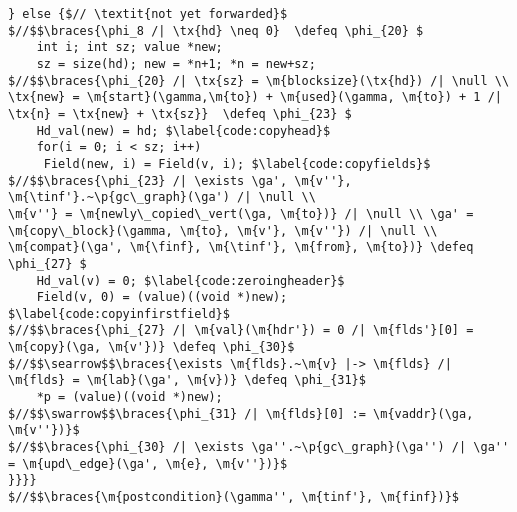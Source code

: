 \begin{figure*}[!ht]
\begin{lstlisting}[multicols=2]
   } else {$// \textit{not yet forwarded}$
$//$$\braces{\phi_8 /| \tx{hd} \neq 0}  \defeq \phi_{20} $
    int i; int sz; value *new;
    sz = size(hd); new = *n+1; *n = new+sz;
$//$$\braces{\phi_{20} /| \tx{sz} = \m{blocksize}(\tx{hd}) /| \null \\ \tx{new} = \m{start}(\gamma,\m{to}) + \m{used}(\gamma, \m{to}) + 1 /| \tx{n} = \tx{new} + \tx{sz}}  \defeq \phi_{23} $      
    Hd_val(new) = hd; $\label{code:copyhead}$
    for(i = 0; i < sz; i++) 
     Field(new, i) = Field(v, i); $\label{code:copyfields}$
$//$$\braces{\phi_{23} /| \exists \ga', \m{v''}, \m{\tinf'}.~\p{gc\_graph}(\ga') /| \null \\ 
\m{v''} = \m{newly\_copied\_vert(\ga, \m{to})} /| \null \\ \ga' = \m{copy\_block}(\gamma, \m{to}, \m{v'}, \m{v''}) /| \null \\ 
\m{compat}(\ga', \m{\finf}, \m{\tinf'}, \m{from}, \m{to})} \defeq \phi_{27} $
    Hd_val(v) = 0; $\label{code:zeroingheader}$
    Field(v, 0) = (value)((void *)new); $\label{code:copyinfirstfield}$
$//$$\braces{\phi_{27} /| \m{val}(\m{hdr'}) = 0 /| \m{flds'}[0] = \m{copy}(\ga, \m{v'})} \defeq \phi_{30}$
$//$$\searrow$$\braces{\exists \m{flds}.~\m{v} |-> \m{flds} /| \m{flds} = \m{lab}(\ga', \m{v})} \defeq \phi_{31}$
    *p = (value)((void *)new);
$//$$\swarrow$$\braces{\phi_{31} /| \m{flds}[0] := \m{vaddr}(\ga, \m{v''})}$
$//$$\braces{\phi_{30} /| \exists \ga''.~\p{gc\_graph}(\ga'') /| \ga'' = \m{upd\_edge}(\ga', \m{e}, \m{v''})}$
}}}}
$//$$\braces{\m{postcondition}(\gamma'', \m{tinf'}, \m{finf})}$
\end{lstlisting}
\vspace{-0.4em}
\caption{Clight code and proof sketch for forward}
\label{fig:forward}
\vspace{-1em}
\end{figure*}

